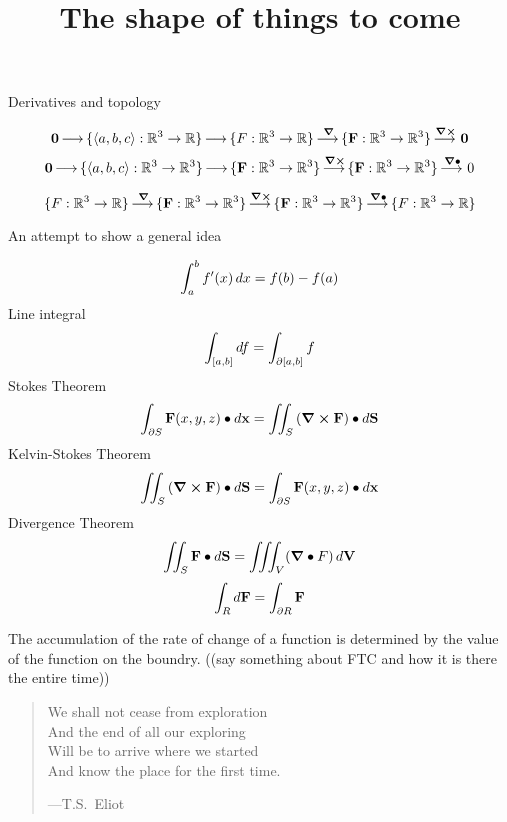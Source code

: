 \documentclass{ximera}
\title[Dig-In:]{The shape of things to come}
\newcommand{\lto}{\mathop{\longrightarrow\,}\limits}
\begin{document}
\begin{abstract}
\end{abstract}
\maketitle


Derivatives and topology

\[
\vec{0} \lto \{\vector{a,b,c}:\R^3\to \R\} \lto \{F:\R^3 \to \R\} \lto^{\grad} \{\vec{F}: \R^3 \to \R^3\} \lto^{\curl} \vec{0}
\]
\[
\vec{0}\lto \{\vector{a,b,c}:\R^3\to \R^3\}\lto \{\vec{F}: \R^3 \to \R^3\}\lto^{\curl} \{\vec{F}:\R^3 \to \R^3\} \lto^{\divergence} 0
\]

\[
\{F:\R^3 \to \R\} \lto^{\grad} \{\vec{F}: \R^3 \to \R^3\} \lto^{\curl}
\{\vec{F}:\R^3 \to \R^3\} \lto^{\divergence} \{F:\R^3 \to \R\}
\]

An attempt to show a general idea

\[
\int_a^b f'(x) \mathop{}\!d x = f(b) - f(a)
\]
Line integral
\[
\int_{[a,b]} \mathop{}\!d f = \int_{\partial[a,b]} f
\]
Stokes Theorem
\[
\int_{\partial S} \mathbf{F}(x,y,z)\bullet \mathop{}\!d \mathbf{x} = \iint_S \left(\boldsymbol\nabla\boldsymbol\times\mathbf{F}\right)\bullet \mathop{}\!d \mathbf{S}
\]
Kelvin-Stokes Theorem
\[
\iint_S \left(\boldsymbol\nabla\boldsymbol\times\mathbf{F}\right)\bullet \mathop{}\!d \mathbf{S} = \int_{\partial S} \mathbf{F}(x,y,z)\bullet \mathop{}\!d \mathbf{x}
\]
Divergence Theorem
\[
\iint_S \mathbf{F}\bullet \mathop{}\!d \mathbf{S} = \iiint_V (\boldsymbol\nabla\bullet F) \mathop{}\!d \mathbf{V}
\]
\[
\int_R \mathop{}\!d \mathbf{F} = \int_{\partial R} \mathbf{F}
\]

The accumulation of the rate of change of a function is determined by
the value of the function on the boundry. ((say something about FTC and how it is there the entire time))

\begin{quote}
  We shall not cease from exploration\\
  And the end of all our exploring \\
  Will be to arrive where we started \\
  And know the place for the first time.

  \hfill ---T.S.\ Eliot
\end{quote}
\end{document}
